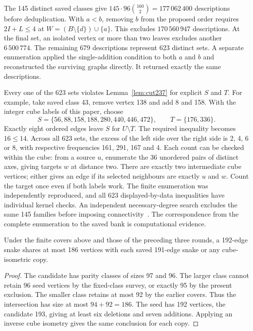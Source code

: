 The 145 distinct saved classes give
$145\cdot96\binom{160}{2}=177\,062\,400$ descriptions before
deduplication. With $a<b$, removing $b$ from the proposed order requires
$2I+L\le4$ at $W=(B\setminus\{d\})\cup\{a\}$. This excludes
$170\,560\,947$ descriptions. At the final set, an isolated vertex or
more than two leaves excludes another $6\,500\,774$. The remaining
679 descriptions represent 623 distinct sets. A separate enumeration
applied the single-addition condition to both $a$ and $b$ and reconstructed
the surviving graphs directly. It returned exactly the same descriptions.

Every one of the 623 sets violates Lemma~\ref{lem:cut237} for explicit
$S$ and $T$. For example, take saved class 43, remove vertex 138 and add
8 and 158. With the integer cube labels of this paper, choose
\[
 S=\{56,88,158,188,280,440,446,472\},\qquad T=\{176,336\}.
\]
Exactly eight ordered edges leave $S$ for $U\setminus T$. The required
inequality becomes $16\le14$. Across all 623 sets, the excess of the
left side over the right side is 2, 4, 6 or 8, with respective
frequencies 161, 291, 167 and 4. Each count can be checked within the
cube: from a source $u$, enumerate the 36 unordered pairs of distinct
axes, giving targets $w$ at distance two. There are exactly two
intermediate cube vertices; either gives an edge if its selected
neighbours are exactly $u$ and $w$. Count the target once even if both
labels work. The finite enumeration was independently reproduced, and
all 623 displayed-by-data inequalities have individual kernel checks.
An independent necessary-degree search excludes the same 145 families
before imposing connectivity~\cite{research237}. The correspondence from
the complete enumeration to the saved bank is computational evidence.

\begin{corollary}
Under the finite covers above and those of the preceding three rounds,
a 192-edge snake shares at most 186 vertices with each saved 191-edge
snake or any cube-isometric copy.
\end{corollary}
\begin{proof}
The candidate has parity classes of sizes 97 and 96. The larger class
cannot retain 96 seed vertices by the fixed-class survey, or exactly 95
by the present exclusion. The smaller class retains at most 92 by the
earlier covers. Thus the intersection has size at most $94+92=186$.
The seed has 192 vertices, the candidate 193, giving at least six
deletions and seven additions. Applying an inverse cube isometry gives
the same conclusion for each copy.
\end{proof}

